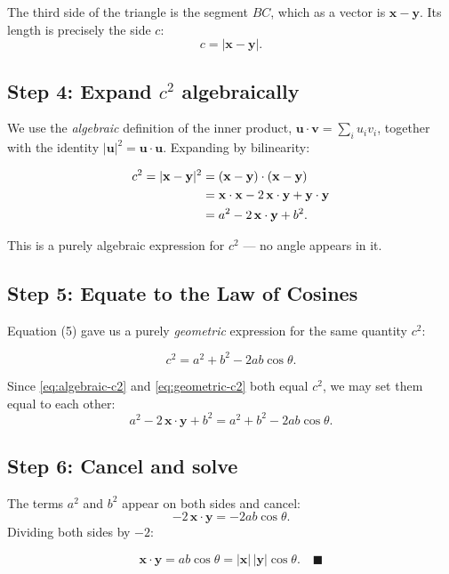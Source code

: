 \documentclass[12pt]{article}
\newcommand{\MVec}[1]{\mathbf{#1}}
\begin{document}
The third side of the triangle is the
segment $BC$, which as a vector is $\MVec{x} - \MVec{y}$. Its length is
precisely the side $c$:
\begin{equation}
    c = |\MVec{x} - \MVec{y}|.
\end{equation}

\subsection*{Step 4: Expand $c^2$ algebraically}
We use the \emph{algebraic} definition of the inner product,
$\MVec{u}\cdot\MVec{v} = \sum_i u_i v_i$, together with the identity
$|\MVec{u}|^2 = \MVec{u}\cdot\MVec{u}$. Expanding by bilinearity:

\begin{align}
    c^2 = |\MVec{x}-\MVec{y}|^2
        &= (\MVec{x}-\MVec{y})\cdot(\MVec{x}-\MVec{y}) \notag\\
        &= \MVec{x}\cdot\MVec{x} - 2\,\MVec{x}\cdot\MVec{y} + \MVec{y}\cdot\MVec{y} \notag\\
        &= a^2 - 2\,\MVec{x}\cdot\MVec{y} + b^2.
        \label{eq:algebraic-c2}
\end{align}

This is a purely algebraic expression for $c^2$ — no angle appears in it.

\subsection*{Step 5: Equate to the Law of Cosines}
Equation (5) gave us a purely \emph{geometric} expression for the same
quantity $c^2$:

\begin{equation}
    c^2 = a^2 + b^2 - 2ab\cos\theta.
    \label{eq:geometric-c2}
\end{equation}

Since \eqref{eq:algebraic-c2} and \eqref{eq:geometric-c2} both equal $c^2$,
we may set them equal to each other:
\[
    a^2 - 2\,\MVec{x}\cdot\MVec{y} + b^2 = a^2 + b^2 - 2ab\cos\theta.
\]

\subsection*{Step 6: Cancel and solve}
The terms $a^2$ and $b^2$ appear on both sides and cancel:
\[
    -2\,\MVec{x}\cdot\MVec{y} = -2ab\cos\theta.
\]
Dividing both sides by $-2$:

\begin{equation}
    \MVec{x}\cdot\MVec{y} = ab\cos\theta = |\MVec{x}|\,|\MVec{y}|\cos\theta.
    \quad\blacksquare
\end{equation}
\end{document}

